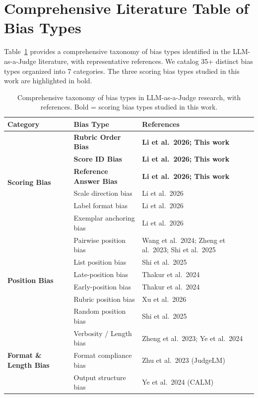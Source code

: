 \section{Comprehensive Literature Table of Bias Types}
\label{app:literature_table}

Table~\ref{tab:bias_types} provides a comprehensive taxonomy of bias types identified in the LLM-as-a-Judge literature, with representative references. We catalog 35+ distinct bias types organized into 7 categories. The three scoring bias types studied in this work are highlighted in bold.

\begin{table}[h]
\centering\small
\caption{Comprehensive taxonomy of bias types in LLM-as-a-Judge research, with references. Bold = scoring bias types studied in this work.}
\label{tab:bias_types}
\begin{tabular}{lll}
\toprule
\textbf{Category} & \textbf{Bias Type} & \textbf{References} \\
\midrule
\multirow{6}{*}{\textbf{Scoring Bias}}
& \textbf{Rubric Order Bias} & \textbf{Li et al.~2026; This work} \\
& \textbf{Score ID Bias} & \textbf{Li et al.~2026; This work} \\
& \textbf{Reference Answer Bias} & \textbf{Li et al.~2026; This work} \\
& Scale direction bias & Li et al.~2026 \\
& Label format bias & Li et al.~2026 \\
& Exemplar anchoring bias & Li et al.~2026 \\
\midrule
\multirow{6}{*}{\textbf{Position Bias}}
& Pairwise position bias & Wang et al.~2024; Zheng et al.~2023; Shi et al.~2025 \\
& List position bias & Shi et al.~2025 \\
& Late-position bias & Thakur et al.~2024 \\
& Early-position bias & Thakur et al.~2024 \\
& Rubric position bias & Xu et al.~2026 \\
& Random position bias & Shi et al.~2025 \\
\midrule
\multirow{6}{*}{\textbf{Format \& Length Bias}}
& Verbosity / Length bias & Zheng et al.~2023; Ye et al.~2024 \\
& Format compliance bias & Zhu et al.~2023 (JudgeLM) \\
& Output structure bias & Ye et al.~2024 (CALM) \\

\end{tabular}
\end{table}
